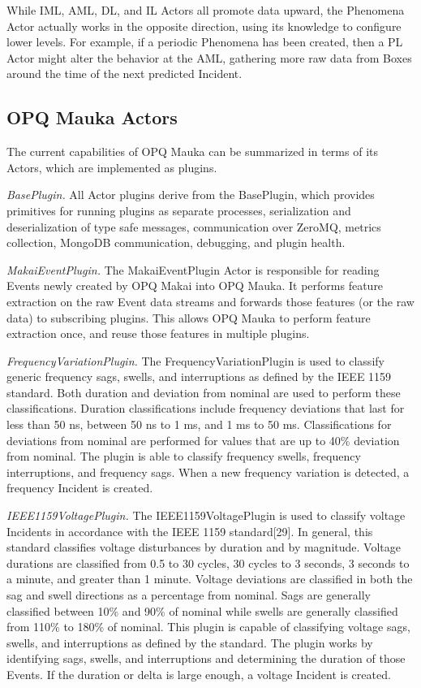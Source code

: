 While IML, AML, DL, and IL Actors all promote data upward, the Phenomena Actor actually works in the opposite direction, using its knowledge to configure lower levels. For example, if a periodic Phenomena has been created, then a PL Actor might alter the behavior at the AML, gathering more raw data from Boxes around the time of the next predicted Incident.


\subsection{OPQ Mauka Actors}

The current capabilities of OPQ Mauka can be summarized in terms of its Actors, which are implemented as plugins.

{\em BasePlugin.} All Actor plugins derive from the BasePlugin, which provides primitives for running plugins as separate processes, serialization and deserialization of type safe messages, communication over ZeroMQ, metrics collection, MongoDB communication, debugging, and plugin health.

{\em MakaiEventPlugin.} The MakaiEventPlugin Actor is responsible for reading Events newly created by OPQ Makai into OPQ Mauka. It performs feature extraction on the raw Event data streams and forwards those features (or the raw data) to subscribing plugins. This allows OPQ Mauka to perform feature extraction once, and reuse those features in multiple plugins.

{\em FrequencyVariationPlugin.} The FrequencyVariationPlugin is used to classify generic frequency sags, swells, and interruptions as defined by the IEEE 1159 standard. Both duration and deviation from nominal are used to perform these classifications. Duration classifications include frequency deviations that last for less than 50 ns, between 50 ns to 1 ms, and 1 ms to 50 ms. Classifications for deviations from nominal are performed for values that are up to 40\% deviation from nominal. The plugin is able to classify frequency swells, frequency interruptions, and frequency sags. When a new frequency variation is detected, a frequency Incident is created.


{\em IEEE1159VoltagePlugin.} The IEEE1159VoltagePlugin is used to classify voltage Incidents in accordance with the IEEE 1159 standard[29]. In general, this standard classifies voltage disturbances by duration and by magnitude. Voltage durations are classified from 0.5 to 30 cycles, 30 cycles to 3 seconds, 3 seconds to a minute, and greater than 1 minute. Voltage deviations are classified in both the sag and swell directions as a percentage from nominal. Sags are generally classified between 10\% and 90\% of nominal while swells are generally classified from 110\% to 180\% of nominal. This plugin is capable of classifying voltage sags, swells, and interruptions as defined by the standard. The plugin works by identifying sags, swells, and interruptions and determining the duration of those Events. If the duration or delta is large enough, a voltage Incident is created.

